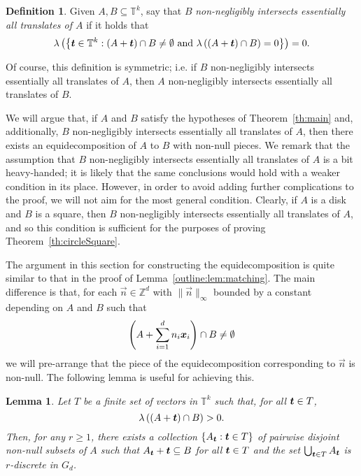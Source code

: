\documentclass[12pt,a4paper]{amsart}
\numberwithin{equation}{section}
\newtheorem{lemma}[equation]{Lemma}
\theoremstyle{definition}
\newtheorem{defn}[equation]{Definition}
\begin{document}
\begin{defn}
Given $A,B\subseteq \mathbb{T}^k$, say that $B$ \emph{non-negligibly intersects essentially all translates of $A$} if it holds that
\[\lambda\left(\left\{\boldsymbol{t}\in\mathbb{T}^k: (A+\boldsymbol{t})\cap B\neq \emptyset \text{ and } \lambda\left((A+\boldsymbol{t})\cap B\right)=0\right\}\right) = 0.\]
\end{defn}

Of course, this definition is symmetric; i.e. if $B$ non-negligibly intersects essentially all translates of $A$, then $A$ non-negligibly intersects essentially all translates of $B$. 

We will argue that, if $A$ and $B$ satisfy the hypotheses of Theorem~\ref{th:main} and, additionally, $B$ non-negligibly intersects essentially all translates of $A$, then there exists an equidecomposition of $A$ to $B$ with non-null pieces. We remark that the assumption that $B$ non-negligibly intersects essentially all translates of $A$ is a bit heavy-handed; it is likely that the same conclusions would hold with a weaker condition in its place. However, in order to avoid adding further complications to the proof, we will not aim for the most general condition. Clearly, if $A$ is a disk and $B$ is a square, then $B$ non-negligibly intersects essentially all translates of $A$, and so this condition is sufficient for the purposes of proving Theorem~\ref{th:circleSquare}.

The argument in this section for constructing the equidecomposition is quite similar to that in the proof of Lemma~\ref{outline:lem:matching}. The main difference is that, for each $\vec{n}\in \mathbb{Z}^d$ with $\|\vec{n}\|_\infty$ bounded by a constant depending on $A$ and $B$ such that 
\[\left(A + \sum_{i=1}^dn_i\boldsymbol{x}_i\right)\cap B\neq \emptyset\]
we will pre-arrange that the piece of the equidecomposition corresponding to $\vec{n}$ is non-null. The following lemma is useful for achieving this.

\begin{lemma}
\label{lem:preSelect}
Let $T$ be a finite set of vectors in $\mathbb{T}^k$ such that, for all $\boldsymbol{t}\in T$,
\[\lambda\left((A+\boldsymbol{t})\cap B\right)>0.\]
Then, for any $r\geq1$, there exists a collection $\{A_{\boldsymbol{t}}: \boldsymbol{t}\in T\}$ of pairwise disjoint non-null subsets of $A$ such that $A_{\boldsymbol{t}}+\boldsymbol{t}\subseteq B$ for all $\boldsymbol{t}\in T$ and the set $\bigcup_{\boldsymbol{t}\in T}A_{\boldsymbol{t}}$ is $r$-discrete in $G_d$.
\end{lemma}
\end{document}
